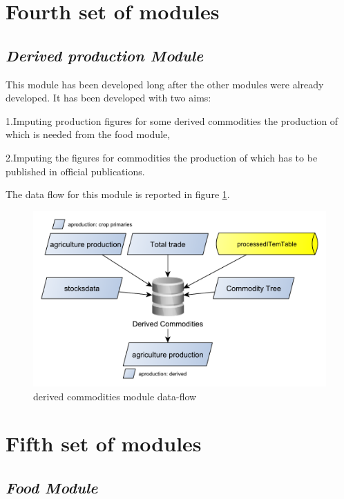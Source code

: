 \documentclass[]{article}
\begin{document}
\section{Fourth set of modules}\label{fourth-set-of-modules}

\subsection{\texorpdfstring{\emph{Derived production
Module}}{Derived production Module}}\label{derived-production-module}

This module has been developed long after the other modules were already
developed. It has been developed with two aims:

1.Imputing production figures for some derived commodities the
production of which is needed from the food module,

2.Imputing the figures for commodities the production of which has to be
published in official publications.

The data flow for this module is reported in figure \ref{fig:f14}.

\begin{figure}[H]

{\centering \includegraphics[width=0.6\linewidth]{images/SwsFbs/14_derived} 

}

\caption{\label{fig:f14}derived commodities module data-flow}\label{fig:f14}
\end{figure}

\section{Fifth set of modules}\label{fifth-set-of-modules}

\subsection{\texorpdfstring{\emph{Food
Module}}{Food Module}}\label{food-module}
\end{document}

